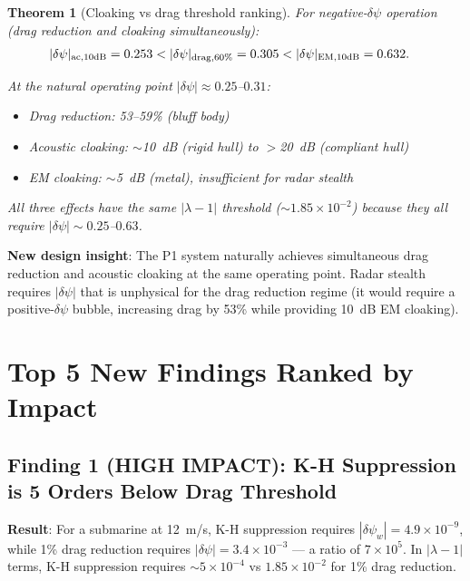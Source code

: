 \documentclass[11pt,twocolumn]{article}
\newcommand{\dpsi}{\delta\psi}
\newcommand{\lam}{\lambda}
\newtheorem{theorem}{Theorem}
\begin{document}
\begin{theorem}[Cloaking vs drag threshold ranking]
\label{thm:cloaking_ranking}
For negative-$\dpsi$ operation (drag reduction and cloaking simultaneously):
\begin{align}
|\dpsi|_{\rm ac,10dB} &= 0.253 < |\dpsi|_{\rm drag,60\%} = 0.305
  < |\dpsi|_{\rm EM,10dB} = 0.632.
\end{align}

At the natural operating point $|\dpsi| \approx 0.25$--$0.31$:
\begin{itemize}[nosep]
\item Drag reduction: 53--59\% (bluff body)
\item Acoustic cloaking: $\sim$10~dB (rigid hull) to $>$20~dB (compliant hull)
\item EM cloaking: $\sim$5~dB (metal), insufficient for radar stealth
\end{itemize}

All three effects have the same $|\lam-1|$ threshold ($\sim 1.85\times10^{-2}$)
because they all require $|\dpsi| \sim 0.25$--$0.63$.
\end{theorem}

\textbf{New design insight}: The P1 system naturally achieves simultaneous
drag reduction and acoustic cloaking at the same operating point. Radar
stealth requires $|\dpsi|$ that is unphysical for the drag reduction regime
(it would require a positive-$\dpsi$ bubble, increasing drag by 53\% while
providing 10~dB EM cloaking).

\section{Top 5 New Findings Ranked by Impact}
\label{sec:top5}

\subsection{Finding 1 (HIGH IMPACT): K-H Suppression is 5 Orders Below Drag
Threshold}

\textbf{Result}: For a submarine at 12~m/s, K-H suppression requires
$|\dpsi_w| = 4.9\times10^{-9}$, while 1\% drag reduction requires
$|\dpsi| = 3.4\times10^{-3}$ --- a ratio of $7\times10^5$. In $|\lam-1|$
terms, K-H suppression requires $\sim 5\times10^{-4}$ vs $1.85\times10^{-2}$
for 1\% drag reduction.
\end{document}
